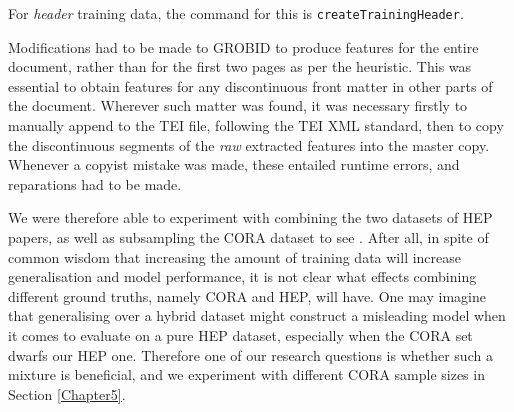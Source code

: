 For \emph{header} training data, the command for this is \texttt{createTrainingHeader}.

Modifications had to be made to GROBID to produce features for the entire document, rather than for the first two pages as per the heuristic. This was essential to obtain features for any discontinuous front matter in other parts of the document. Wherever such matter was found, it was necessary firstly to manually append to the TEI file, following the TEI XML standard, then to copy the discontinuous segments of the \emph{raw} extracted features into the master copy. Whenever a copyist mistake was made, these entailed runtime errors, and reparations had to be made.

We were therefore able to experiment with combining the two datasets of HEP papers, as well as subsampling the CORA dataset to see . After all, in spite of common wisdom that increasing the amount of training data will increase generalisation and model performance, it is not clear what effects combining different ground truths, namely CORA and HEP, will have. One may imagine that generalising over a hybrid dataset might construct a misleading model when it comes to evaluate on a pure HEP dataset, especially when the CORA set dwarfs our HEP one. Therefore one of our research questions is whether such a mixture is beneficial, and we experiment with different CORA sample sizes in Section \ref{Chapter5}.

